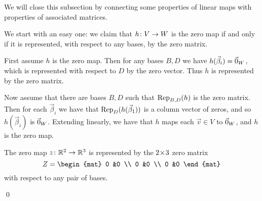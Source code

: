 \documentclass[10pt,t]{beamer}
\begin{document}
\begin{frame}
We will close this subsection by connecting some properties of linear maps
with properties of associated matrices.

We start with an easy one: 
we claim that $\map{h}{V}{W}$ is the zero map if and only
if it is represented, with respect to any bases, by the zero matrix.

\pause
First assume $h$ is the zero map.
Then for any bases $B,D$ we have $h(\vec{\beta}_i)=\zero_W$, which is 
represented with respect to $D$ by the zero vector.
Thus $h$ is represented by the zero matrix.

\pause
Now assume that there are bases $B,D$ such that $\rep{h}{B,D}$ is the zero
matrix.
Then for each $\vec{\beta}_i$ we have that $\rep{h(\vec{\beta}_1)}{D}$ is a
column vector of zeros, and so $h(\vec{\beta}_i)$ is $\zero_W$.
Extending linearly, we have that $h$ maps each $\vec{v}\in V$ to $\zero_W$,
and $h$ is the zero map.  

\pause
\ex The zero map $\map{z}{\Re^2}{\Re^3}$ is represented by the $\nbym{2}{3}$
zero matrix
\begin{equation*}
  Z=
  \begin{mat}
    0 &0 \\
    0 &0 \\
    0 &0
  \end{mat}
\end{equation*}
with respect to any pair of bases.

\end{frame}




\begin{frame}
\th[th:RankMatEqRankMap]
\pause
\pf
{}

\pause
{}
\end{frame}
\begin{frame}
\qed
\end{frame}
\end{document}
